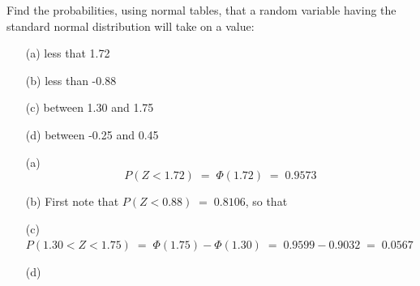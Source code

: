 \begin{example}\label{Eg:UsingNormalTables}
Find the probabilities, using  normal tables,  that a random variable having the standard
  normal distribution will take on a value:
\begin{itemize}
\item [(a)] less that 1.72
\item [(b)]less than -0.88
\item [(c)]between 1.30 and 1.75
\item [(d)] between -0.25 and 0.45
\end{itemize}\ecols
\begin{itemize}
 \item [(a)]
$$P(Z<1.72)\;=\;\Phi(1.72) \;=\; 0.9573$$
 \item [(b)] First note that $P(Z<0.88)\;=\;0.8106$, so that
 \item [(c)]
$P(1.30<Z<1.75)\;=\;\Phi(1.75)-\Phi(1.30)\;=\;0.9599-0.9032\;=\;0.0567$
 \item [(d)]
\end{itemize}
\end{example}



\bigskip


